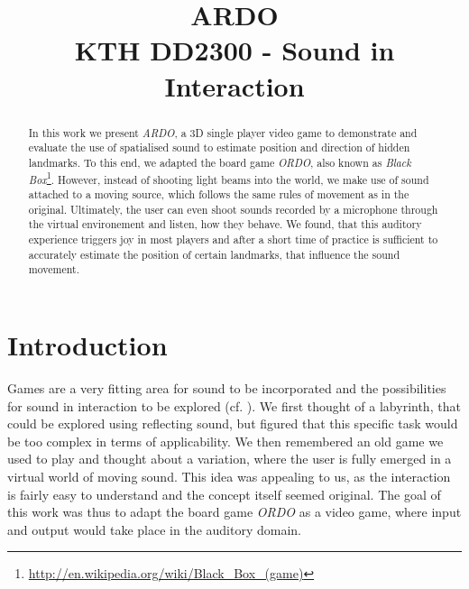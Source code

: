 \documentclass[conference]{IEEEtran}
\begin{document}
% 
\title{ARDO \\ {\LARGE KTH DD2300 - Sound in Interaction}}
\author{
    \and
}
\maketitle
% 
% 
\begin{abstract}
In this work we present \textit{ARDO}, a 3D single player video game to demonstrate and evaluate the use of spatialised sound to estimate position and direction of hidden landmarks. 
To this end, we adapted the board game \textit{ORDO}, also known as \textit{Black Box}\footnote{\url{http://en.wikipedia.org/wiki/Black_Box_(game)}}. 
However, instead of shooting light beams into the world, we make use of sound attached to a moving source, which follows the same rules of movement as in the original. 
Ultimately, the user can even shoot sounds recorded by a microphone through the virtual environement and listen, how they behave. 
We found, that this auditory experience triggers joy in most players and after a short time of practice is sufficient to accurately estimate the position of certain landmarks, that influence the sound movement.
\end{abstract}
% 
% 
\section{Introduction}
Games are a very fitting area for sound to be incorporated and the possibilities for sound in interaction to be explored (cf. \cite{Hermann06}). 
We first thought of a labyrinth, that could be explored using reflecting sound, but figured that this specific task would be too complex in terms of applicability. 
We then remembered an old game we used to play and thought about a variation, where the user is fully emerged in a virtual world of moving sound. 
This idea was appealing to us, as the interaction is fairly easy to understand and the concept itself seemed original. 
The goal of this work was thus to adapt the board game \textit{ORDO} as a video game, where input and output would take place in the auditory domain.
% 
% 
\end{document}

